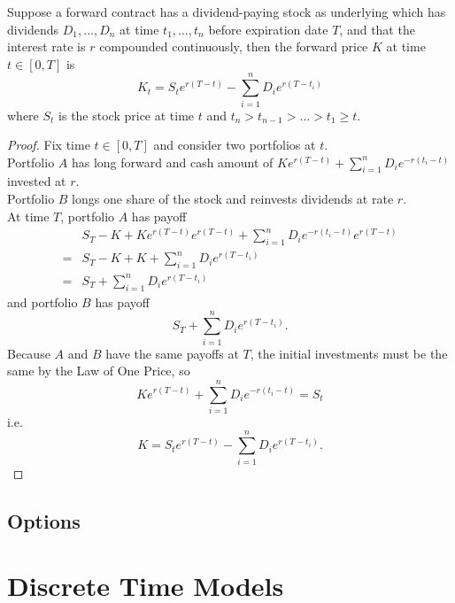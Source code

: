 \documentclass[11pt,fleqn]{book} %
\begin{document}
\begin{theorem} \label{thm:155}
Suppose a forward contract has a dividend-paying stock as underlying which has dividends \(D_1, \ldots, D_n\)
at time \(t_1, \ldots, t_n\) before expiration date \(T\), and that the interest rate is \(r\) compounded
continuously, then the forward price \(K\) at time \(t \in [0, T]\) is
\[
K_t = S_te^{r(T - t)} - \sum_{i=1}^nD_ie^{r(T - t_i)}
\]
where \(S_t\) is the stock price at time \(t\) and \(t_n > t_{n - 1} > \dots > t_1 \geq t\).
\end{theorem}
        
\begin{proof}
Fix time \(t \in [0, T]\) and consider two portfolios at \(t\). \\
\indent Portfolio \(A\) has long forward and cash amount of \(Ke^{r(T - t)} + \sum_{i=1}^n D_ie^{-r(t_i - t)}\)
invested at \(r\). \\
\indent Portfolio \(B\) longs one share of the stock and reinvests dividends at rate \(r\). \\
\indent At time \(T\), portfolio \(A\) has payoff
\[
\begin{aligned}
&S_T - K + Ke^{r(T - t)}e^{r(T - t)} + \sum_{i=1}^n D_ie^{-r(t_i - t)}e^{r(T - t)} \\
= &S_T - K + K + \sum_{i=1}^n D_i e^{r(T - t_i)} \\
= &S_T + \sum_{i=1}^nD_ie^{r(T - t_i)}
\end{aligned}
\]
and portfolio \(B\) has payoff
\[
S_T + \sum_{i=1}^nD_ie^{r(T - t_i)}.
\]
\indent Because \(A\) and \(B\) have the same payoffs at \(T\), the initial investments must be the same by the
Law of One Price, so
\[
Ke^{r(T - t)} + \sum_{i=1}^nD_ie^{-r(t_i - t)} = S_t
\]
i.e.
\[
K = S_te^{r(T - t)} - \sum_{i=1}^nD_ie^{r(T - t_i)}.
\]
\end{proof}


\section{Options}



\chapter{Discrete Time Models}
\end{document}
